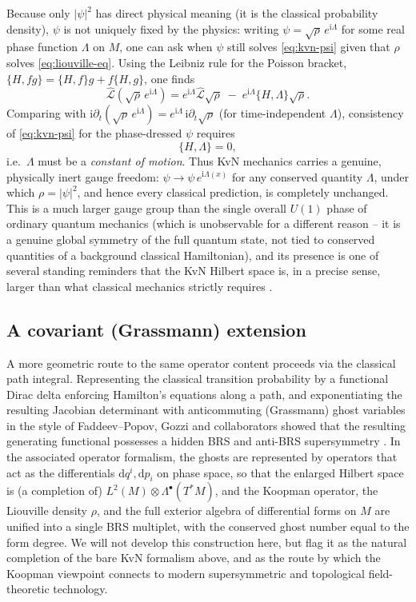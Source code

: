 \documentclass[11pt]{article}
\theoremstyle{remark}
\newcommand{\PB}[2]{\{#1,#2\}}
\newcommand{\CL}{\widehat{\mathcal{L}}}
\newcommand{\dd}{\mathrm{d}}
\newcommand{\ii}{\mathrm{i}}
\begin{document}
Because only $|\psi|^2$ has direct physical meaning (it is the classical probability density), $\psi$ is not uniquely fixed by the physics: writing $\psi=\sqrt\rho\,e^{\ii\Lambda}$ for some real phase function $\Lambda$ on $M$, one can ask when $\psi$ still solves \eqref{eq:kvn-psi} given that $\rho$ solves \eqref{eq:liouville-eq}. Using the Leibniz rule for the Poisson bracket, $\PB{H}{fg}=\PB{H}{f}g+f\PB{H}{g}$, one finds
\begin{equation}
\CL(\sqrt\rho\,e^{\ii\Lambda}) = e^{\ii\Lambda}\CL\sqrt\rho \;-\; e^{\ii\Lambda}\PB{H}{\Lambda}\sqrt\rho .
\end{equation}
Comparing with $\ii\partial_t(\sqrt\rho\,e^{\ii\Lambda}) = e^{\ii\Lambda}\,\ii\partial_t\sqrt\rho$ (for time-independent $\Lambda$), consistency of \eqref{eq:kvn-psi} for the phase-dressed $\psi$ requires
\begin{equation}
\PB{H}{\Lambda} = 0,
\end{equation}
i.e.\ $\Lambda$ must be a \emph{constant of motion}. Thus KvN mechanics carries a genuine, physically inert gauge freedom: $\psi\to\psi\,e^{\ii\Lambda(x)}$ for any conserved quantity $\Lambda$, under which $\rho=|\psi|^2$, and hence every classical prediction, is completely unchanged. This is a much larger gauge group than the single overall $U(1)$ phase of ordinary quantum mechanics (which is unobservable for a different reason -- it is a genuine global symmetry of the full quantum state, not tied to conserved quantities of a background classical Hamiltonian), and its presence is one of several standing reminders that the KvN Hilbert space is, in a precise sense, larger than what classical mechanics strictly requires \cite{Mauro2002}.

\subsection{A covariant (Grassmann) extension}

A more geometric route to the same operator content proceeds via the classical path integral. Representing the classical transition probability by a functional Dirac delta enforcing Hamilton's equations along a path, and exponentiating the resulting Jacobian determinant with anticommuting (Grassmann) ghost variables in the style of Faddeev--Popov, Gozzi and collaborators showed that the resulting generating functional possesses a hidden BRS and anti-BRS supersymmetry \cite{Gozzi1988,GozziReuterThacker1989}. In the associated operator formalism, the ghosts are represented by operators that act as the differentials $\dd q^i,\dd p_i$ on phase space, so that the enlarged Hilbert space is (a completion of) $L^2(M)\otimes\Lambda^\bullet(T^*M)$, and the Koopman operator, the Liouville density $\rho$, and the full exterior algebra of differential forms on $M$ are unified into a single BRS multiplet, with the conserved ghost number equal to the form degree. We will not develop this construction here, but flag it as the natural completion of the bare KvN formalism above, and as the route by which the Koopman viewpoint connects to modern supersymmetric and topological field-theoretic technology.
\end{document}

